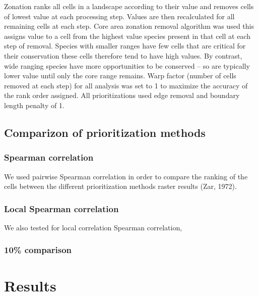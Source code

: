 \documentclass[]{article}
\begin{document}
Zonation ranks all cells in a landscape according to their value and removes cells of lowest value at each processing step. Values are then recalculated for all remaining cells at each step. Core area zonation removal algorithm was used this assigns value to a cell from the highest value species present in that cell at each step of removal. Species with smaller ranges have few cells that are critical for their conservation these cells therefore tend to have high values. By contrast, wide ranging species have more opportunities to be conserved -- so are typically lower value until only the core range remains. Warp factor (number of cells removed at each step) for all analysis was set to 1 to maximize the accuracy of the rank order assigned. All prioritizations used edge removal and boundary length penalty of 1.

\hypertarget{comparizon-of-prioritization-methods}{%
\subsection{Comparizon of prioritization methods}\label{comparizon-of-prioritization-methods}}

\hypertarget{spearman-correlation}{%
\subsubsection{Spearman correlation}\label{spearman-correlation}}

We used pairwise Spearman correlation in order to compare the ranking of the cells between the different prioritization methods raster results (Zar, 1972).

\hypertarget{local-spearman-correlation}{%
\subsubsection{Local Spearman correlation}\label{local-spearman-correlation}}

We also tested for local correlation Spearman correlation,

\hypertarget{comparison}{%
\subsubsection{10\% comparison}\label{comparison}}

\hypertarget{results}{%
\section*{Results}\label{results}}
\end{document}
